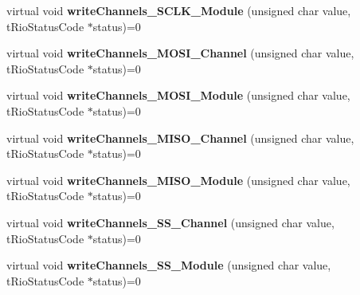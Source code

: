 \begin{DoxyCompactItemize}
\item 
\hypertarget{classnFPGA_1_1nFRC__2012__1__6__4_1_1tSPI_a3b84f7e89d03a0fdc6b289d5c286b09c}{
virtual void {\bfseries writeChannels\_\-SCLK\_\-Module} (unsigned char value, tRioStatusCode $\ast$status)=0}
\label{classnFPGA_1_1nFRC__2012__1__6__4_1_1tSPI_a3b84f7e89d03a0fdc6b289d5c286b09c}

\item 
\hypertarget{classnFPGA_1_1nFRC__2012__1__6__4_1_1tSPI_a7c6e461cf782b657a48d96d1e4776ccf}{
virtual void {\bfseries writeChannels\_\-MOSI\_\-Channel} (unsigned char value, tRioStatusCode $\ast$status)=0}
\label{classnFPGA_1_1nFRC__2012__1__6__4_1_1tSPI_a7c6e461cf782b657a48d96d1e4776ccf}

\item 
\hypertarget{classnFPGA_1_1nFRC__2012__1__6__4_1_1tSPI_a1c72e47b92f64e7ab631dc0c997ae9b1}{
virtual void {\bfseries writeChannels\_\-MOSI\_\-Module} (unsigned char value, tRioStatusCode $\ast$status)=0}
\label{classnFPGA_1_1nFRC__2012__1__6__4_1_1tSPI_a1c72e47b92f64e7ab631dc0c997ae9b1}

\item 
\hypertarget{classnFPGA_1_1nFRC__2012__1__6__4_1_1tSPI_ad668b3a114db76c2ac0a7d48dbac8b80}{
virtual void {\bfseries writeChannels\_\-MISO\_\-Channel} (unsigned char value, tRioStatusCode $\ast$status)=0}
\label{classnFPGA_1_1nFRC__2012__1__6__4_1_1tSPI_ad668b3a114db76c2ac0a7d48dbac8b80}

\item 
\hypertarget{classnFPGA_1_1nFRC__2012__1__6__4_1_1tSPI_a6cf2b7ffa625c486ef837f7161b0cf22}{
virtual void {\bfseries writeChannels\_\-MISO\_\-Module} (unsigned char value, tRioStatusCode $\ast$status)=0}
\label{classnFPGA_1_1nFRC__2012__1__6__4_1_1tSPI_a6cf2b7ffa625c486ef837f7161b0cf22}

\item 
\hypertarget{classnFPGA_1_1nFRC__2012__1__6__4_1_1tSPI_a919eea02211579380d1f97badfa75ada}{
virtual void {\bfseries writeChannels\_\-SS\_\-Channel} (unsigned char value, tRioStatusCode $\ast$status)=0}
\label{classnFPGA_1_1nFRC__2012__1__6__4_1_1tSPI_a919eea02211579380d1f97badfa75ada}

\item 
\hypertarget{classnFPGA_1_1nFRC__2012__1__6__4_1_1tSPI_a3e82f2556be34b6f1ea5a8f1e8a424f2}{
virtual void {\bfseries writeChannels\_\-SS\_\-Module} (unsigned char value, tRioStatusCode $\ast$status)=0}
\label{classnFPGA_1_1nFRC__2012__1__6__4_1_1tSPI_a3e82f2556be34b6f1ea5a8f1e8a424f2}


\end{DoxyCompactItemize}
